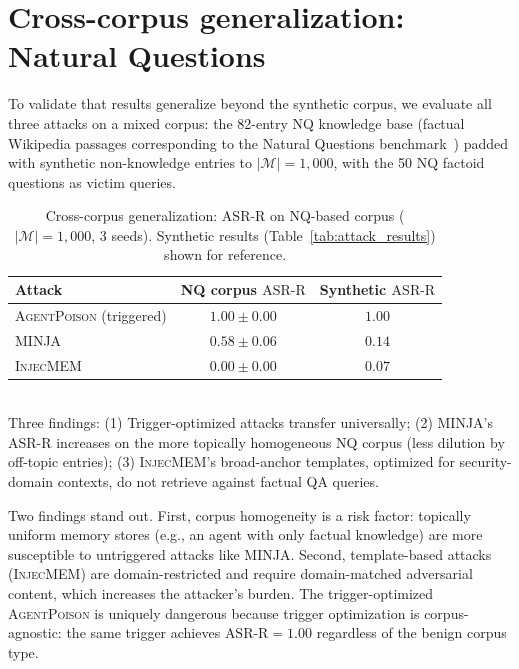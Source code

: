 \documentclass{article}
\theoremstyle{definition}
\newcommand{\asrr}{\text{ASR-R}}
\newcommand{\cM}{\mathcal{M}}
\newcommand{\agentpoison}{\textsc{AgentPoison}}
\newcommand{\minja}{\textsc{MINJA}}
\newcommand{\injecmem}{\textsc{InjecMEM}}
\begin{document}
\section{Cross-corpus generalization: Natural Questions}
\label{app:nq_eval}

To validate that results generalize beyond the synthetic corpus, we evaluate all three attacks on a mixed corpus: the 82-entry NQ knowledge base (factual Wikipedia passages corresponding to the Natural Questions benchmark~\citep{kwiatkowski2019natural}) padded with synthetic non-knowledge entries to $|\cM| = 1{,}000$, with the 50 NQ factoid questions as victim queries.

\begin{table}[ht]
  \centering
  \small
  \caption{Cross-corpus generalization: $\asrr$ on NQ-based corpus ($|\cM|=1{,}000$, 3 seeds). Synthetic results (Table~\ref{tab:attack_results}) shown for reference.}
  \label{tab:nq_eval}
  \vspace{2pt}
  \begin{tabular}{l cc}
    \toprule
    Attack & NQ corpus $\asrr$ & Synthetic $\asrr$ \\
    \midrule
    \agentpoison{} (triggered) & $1.00 \pm 0.00$ & $1.00$ \\
    \minja{}                   & $0.58 \pm 0.06$ & $0.14$ \\
    \injecmem{}                & $0.00 \pm 0.00$ & $0.07$ \\
    \bottomrule
  \end{tabular}
  \\[2pt]
  {\footnotesize Three findings: (1) Trigger-optimized attacks transfer universally; (2) \minja{}'s ASR-R increases on the more topically homogeneous NQ corpus (less dilution by off-topic entries); (3) \injecmem{}'s broad-anchor templates, optimized for security-domain contexts, do not retrieve against factual QA queries.}
\end{table}

Two findings stand out. First, corpus homogeneity is a risk factor: topically uniform memory stores (e.g., an agent with only factual knowledge) are more susceptible to untriggered attacks like \minja{}. Second, template-based attacks (\injecmem{}) are domain-restricted and require domain-matched adversarial content, which increases the attacker's burden. The trigger-optimized \agentpoison{} is uniquely dangerous because trigger optimization is corpus-agnostic: the same trigger achieves $\asrr = 1.00$ regardless of the benign corpus type.
\end{document}
